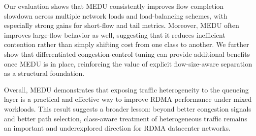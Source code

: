 \documentclass[conference]{IEEEtran}
\begin{document}
Our evaluation shows that MEDU consistently improves flow completion slowdown across multiple network loads and load-balancing schemes, with especially strong gains for short-flow and tail metrics. Moreover, MEDU often improves large-flow behavior as well, suggesting that it reduces inefficient contention rather than simply shifting cost from one class to another. We further show that differentiated congestion-control tuning can provide additional benefits once MEDU is in place, reinforcing the value of explicit flow-size-aware separation as a structural foundation.

Overall, MEDU demonstrates that exposing traffic heterogeneity to the queueing layer is a practical and effective way to improve RDMA performance under mixed workloads. This result suggests a broader lesson: beyond better congestion signals and better path selection, class-aware treatment of heterogeneous traffic remains an important and underexplored direction for RDMA datacenter networks.
\end{document}
